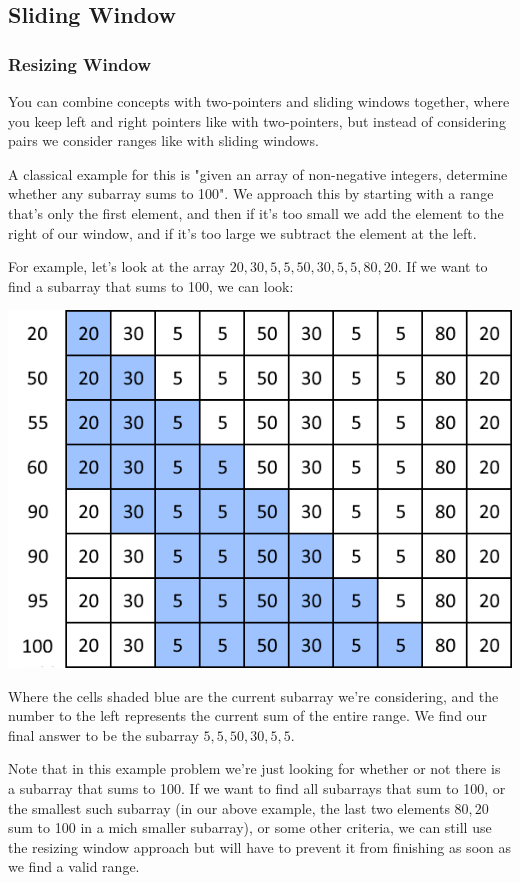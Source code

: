 \subsection{Sliding Window}



\subsubsection{Resizing Window}

You can combine concepts with two-pointers and sliding windows together, where you keep left and right pointers like with two-pointers, but instead of considering pairs we consider ranges like with sliding windows.

A classical example for this is "given an array of non-negative integers, determine whether any subarray sums to 100". We approach this by starting with a range that's only the first element, and then if it's too small we add the element to the right of our window, and if it's too large we subtract the element at the left.

For example, let's look at the array $20,30,5,5,50,30,5,5,80,20$. If we want to find a subarray that sums to 100, we can look:

{\centering \includegraphics{images/iterative/resizing-window}}

Where the cells shaded blue are the current subarray we're considering, and the number to the left represents the current sum of the entire range. We find our final answer to be the subarray $5,5,50,30,5,5$.

Note that in this example problem we're just looking for whether or not there is a subarray that sums to 100. If we want to find all subarrays that sum to 100, or the smallest such subarray (in our above example, the last two elements $80,20$ sum to 100 in a mich smaller subarray), or some other criteria, we can still use the resizing window approach but will have to prevent it from finishing as soon as we find a valid range.

